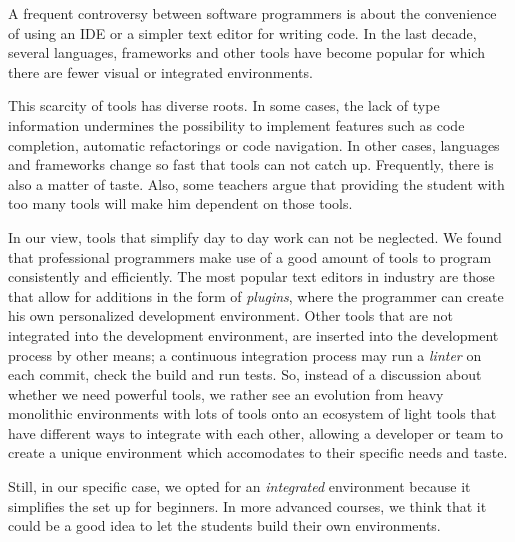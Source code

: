 A frequent controversy between software programmers is about the convenience of using an IDE or a simpler text editor for writing code. In the last decade, several languages, frameworks and other tools have become popular for which there are fewer visual or integrated environments. 

This scarcity of tools has diverse roots. In some cases, the lack of type information undermines the possibility to implement features such as code completion, automatic refactorings or code navigation.
In other cases, languages and frameworks change so fast that tools can not catch up.
Frequently, there is also a matter of taste.
Also, some teachers argue that providing the student with too many tools will make him dependent on those tools.

In our view, tools that simplify day to day work can not be neglected. 
We found that professional programmers make use of a good amount of tools to program consistently and efficiently.
The most popular text editors in industry are those that allow for additions in the form of \emph{plugins}, where the programmer can create his own personalized development environment.
Other tools that are not integrated into the development environment, are inserted into the development process by other means; 
\eg a continuous integration process may run a \emph{linter} on each commit, check the build and run tests.
So, instead of a discussion about whether we need powerful tools, we rather see an evolution from heavy monolithic environments with lots of tools 
onto an ecosystem of light tools that have different ways to integrate with each other,
allowing a developer or team to create a unique environment which accomodates to their specific needs and taste. 

Still, in our specific case, we opted for an \emph{integrated} environment because it simplifies the set up for beginners. 
In more advanced courses, we think that it could be a good idea to let the students build their own environments.

